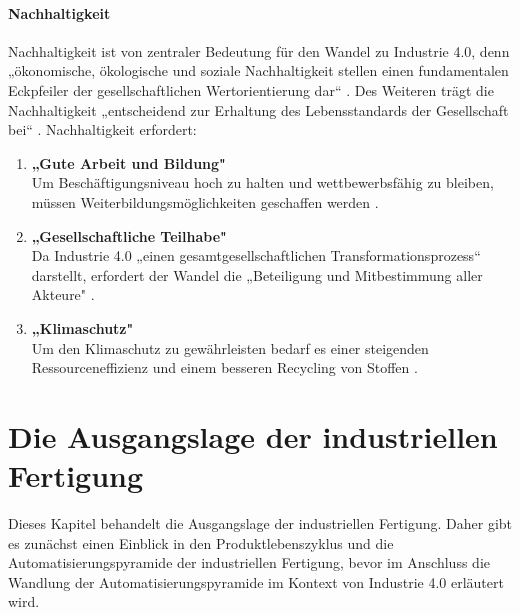 \paragraph{Nachhaltigkeit}\label{sec:Nachhaltigkeit}
\noindent Nachhaltigkeit ist von zentraler Bedeutung für den Wandel zu Industrie 4.0, denn „ökonomische, ökologische und soziale Nachhaltigkeit stellen einen fundamentalen Eckpfeiler der gesellschaftlichen Wertorientierung dar“ \cite[S.6]{3}. Des Weiteren trägt die Nachhaltigkeit „entscheidend zur Erhaltung des Lebensstandards der Gesellschaft bei“ \cite[S.6]{3}.
Nachhaltigkeit erfordert:
\begin{enumerate}
	\item \textbf{„Gute Arbeit und Bildung"} \cite[S.6]{3} \\
	Um Beschäftigungsniveau hoch zu halten und wettbewerbsfähig zu bleiben, müssen
	Weiterbildungsmöglichkeiten geschaffen werden \cite[S.6]{3}.
	\item \textbf{„Gesellschaftliche Teilhabe"} \cite[S.6]{3} \\
	Da Industrie 4.0 „einen gesamtgesellschaftlichen Transformationsprozess“ \cite[S.6]{3} darstellt, erfordert der Wandel die „Beteiligung und Mitbestimmung aller Akteure" \cite[S.6]{3}.
	\item \textbf{„Klimaschutz"} \cite[S.6]{3} \\
	Um den Klimaschutz zu gewährleisten bedarf es einer steigenden Ressourceneffizienz
	und einem besseren Recycling von Stoffen \cite[S.6]{3}.
\end{enumerate}
\section{Die Ausgangslage der industriellen Fertigung}\label{sec:IndustrielleFertigung}
Dieses Kapitel behandelt die Ausgangslage der industriellen Fertigung. Daher gibt es zunächst einen Einblick in den Produktlebenszyklus und die Automatisierungspyramide der industriellen Fertigung, bevor im Anschluss die Wandlung der Automatisierungspyramide im Kontext von Industrie 4.0 erläutert wird.

